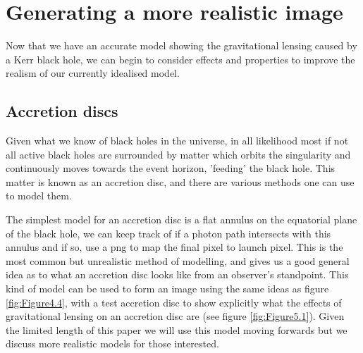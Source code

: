 \documentclass[oneside,openright,frontopenright, singlespacing]{dmathesis}
\begin{document}
\chapter{Generating a more realistic image}\label{chap:Chapter5}

	Now that we have an accurate model showing the gravitational lensing caused by a Kerr black hole, we can begin to consider effects and properties to improve the realism of our currently idealised model.

\section{Accretion discs}\label{sec:Section5.1}

	Given what we know of black holes in the universe, in all likelihood most if not all active black holes are surrounded by matter which orbits the singularity and continuously moves towards the event horizon, 'feeding' the black hole. This matter is known as an accretion disc, and there are various methods one can use to model them.

\vspace{1em}
	The simplest model for an accretion disc is a flat annulus on the equatorial plane of the black hole, we can keep track of if a photon path intersects with this annulus and if so, use a png to map the final pixel to launch pixel. This is the most common but unrealistic method of modelling, and gives us a good general idea as to what an accretion disc looks like from an observer's standpoint. This kind of model can be used to form an image using the same ideas as figure \ref{fig:Figure4.4}, with a test accretion disc to show explicitly what the effects of gravitational lensing on an accretion disc are (see figure \ref{fig:Figure5.1}). Given the limited length of this paper we will use this model moving forwards but we discuss more realistic models for those interested.
\end{document}
